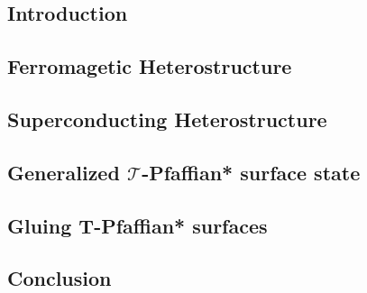
\newcommand{\TPf}{\hyperlink{TPf}{$\mathcal{T}$-$\mathrm{Pf}^\ast$} }


\subsection{\label{sec:Intro}Introduction}

\subsection{\label{FS}Ferromagetic Heterostructure}

\subsection{\label{SCS}Superconducting Heterostructure}

\subsection{\label{TPF}Generalized \texorpdfstring{$\mathcal{T}$}{T}-Pfaffian* surface state}

\subsection{\label{Gluing}Gluing T-Pfaffian* surfaces}

\subsection{\label{Conclusion}Conclusion}

